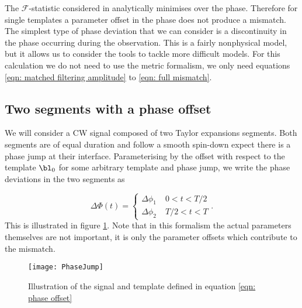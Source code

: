 The $\mathcal{F}$-statistic considered in \citet{Brady1998} analytically 
minimises over the phase. Therefore for single
templates a parameter offset in the phase
does not produce a mismatch. The simplest type of phase deviation that we can
consider is a discontinuity in the phase occurring during the observation. This 
is a fairly nonphysical model, but it allows us to consider the tools to 
tackle more difficult models. For this calculation we do not need to use the
metric formalism, we only need equations \eqref{eqn: matched filtering amplitude}
to \eqref{eqn: full mismatch}.

\subsection{Two segments with a phase offset}
\label{sec: Two segments with a phase offset}

We will consider a CW signal composed of two Taylor expansions segments.  Both
segments are of equal duration and follow a smooth spin-down expect there is a
phase jump at their interface. Parameterising by the offset with respect to
the template $\bl_{0}$ for some arbitrary template and phase jump, we write the
phase deviations in the two segments as

\begin{equation}
 \Delta\Phi(t) = \left\{
\begin{array}{cr}
\Delta \phi_{1}& \; 0 < t < T/2 \\
\Delta \phi_{2} & \;  T/2 < t < T 
\end{array}.
\right.
\label{eqn: phase offset}
\end{equation}
This is illustrated in figure \ref{fig: PhaseJump}. Note that in this formalism
the actual parameters themselves are not important, it is only the parameter
offsets which contribute to the mismatch.
\begin{figure}[htb]
    \centering
    \texttt{[image: PhaseJump]}
    \caption{Illustration of the signal and template defined in equation 
        \eqref{eqn: phase offset}}
    \label{fig: PhaseJump}
\end{figure}

